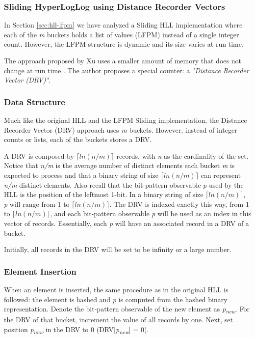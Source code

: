 \subsubsection{Sliding HyperLogLog using Distance Recorder Vectors} \label{sec:hll-drv}

In Section \ref{sec:hll-lfpm} we have analyzed a Sliding HLL implementation where each of the \textit{m} buckets holds a list of values (LFPM) instead of a single integer count. However, the LFPM structure is dynamic and its size varies at run time. 

The approach proposed by Xu uses a smaller amount of memory that does not change at run time \cite{Xu-hll-sliding-drv}. The author proposes a special counter: a \textit{"Distance Recorder Vector (DRV)"}. 

\subsubsection*{Data Structure}
Much like the original HLL and the LFPM Sliding implementation, the Distance Recorder Vector (DRV) approach uses \textit{m} buckets. However, instead of integer counts or lists, each of the buckets stores a DRV. 

A DRV is composed by \textit{$\lceil ln(n/m) \rceil$} records, with \textit{n} as the cardinality of the set. Notice that \textit{n/m} is the average number of distinct elements each bucket \textit{m} is expected to process and that a binary string of size \textit{$\lceil ln(n/m) \rceil$} can represent \textit{n/m} distinct elements. Also recall that the bit-pattern observable \textit{p} used by the HLL is the position of the leftmost 1-bit. In a binary string of size \textit{$\lceil ln(n/m) \rceil$}, \textit{p} will range from 1 to \textit{$\lceil ln(n/m) \rceil$}. The DRV is indexed exactly this way, from 1 to \textit{$\lceil ln(n/m) \rceil$}, and each bit-pattern observable \textit{p} will be used as an index in this vector of records. Essentially, each \textit{p} will have an associated record in a DRV of a bucket.

Initially, all records in the DRV will be set to be infinity or a large number.

\subsubsection*{Element Insertion}
When an element is inserted, the same procedure as in the original HLL is followed: the element is hashed and \textit{p} is computed from the hashed binary representation. Denote the bit-pattern observable of the new element as \textit{p\textsubscript{new}}. For the DRV of that bucket, increment the value of all records by one. Next, set position \textit{p\textsubscript{new}} in the DRV to 0 (DRV[\textit{p\textsubscript{new}}] = 0).


